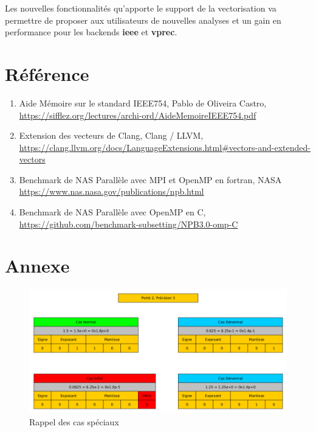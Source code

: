 \documentclass[11pt, letterpaper]{article}
\begin{document}
Les nouvelles fonctionnalités qu'apporte le support de la vectorisation va
permettre de proposer aux utilisateurs de nouvelles analyses et un gain en
performance pour les backends \textbf{ieee} et \textbf{vprec}.

\section{Référence}
\label{sec:org9dc1c7a}

\begin{enumerate}
\item \label{org8401a0b} Aide Mémoire sur le standard IEEE754, Pablo de Oliveira Castro,
\url{https://sifflez.org/lectures/archi-ord/AideMemoireIEEE754.pdf}
\item \label{org086511e} Extension des vecteurs de Clang, Clang / LLVM,
\url{https://clang.llvm.org/docs/LanguageExtensions.html\#vectors-and-extended-vectors}
\item Benchmark de NAS Parallèle avec MPI et OpenMP en fortran, NASA
\url{https://www.nas.nasa.gov/publications/npb.html}
\item Benchmark de NAS Parallèle avec OpenMP en C,
\url{https://github.com/benchmark-subsetting/NPB3.0-omp-C}
\end{enumerate}

\section{Annexe}
\label{sec:org1ea5bd8}

\label{orge0ac20f}
\begin{figure}[htbp]
\centering
\includegraphics[width=450px]{../ressources/special_case.png}
\caption{\label{fig:org09a5066}Rappel des cas spéciaux}
\end{figure}
\end{document}

